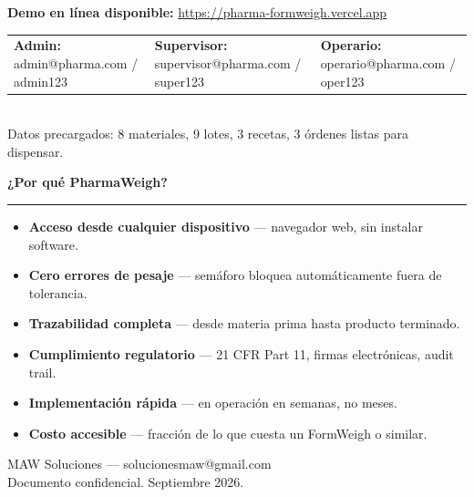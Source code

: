 \documentclass[11pt,letterpaper]{article}
\begin{document}
\vspace{14pt}

\begin{tcolorbox}[colback=pharmagreen!8, colframe=pharmagreen, rounded corners, boxrule=1.2pt, left=12pt, right=12pt, top=8pt, bottom=8pt]
\textbf{\color{pharmagreen}Demo en línea disponible:} \url{https://pharma-formweigh.vercel.app}\\[4pt]
\begin{tabular}{@{}lll@{}}
\textbf{Admin:} admin@pharma.com / admin123 &
\textbf{Supervisor:} supervisor@pharma.com / super123 &
\textbf{Operario:} operario@pharma.com / oper123
\end{tabular}\\[4pt]
Datos precargados: 8 materiales, 9 lotes, 3 recetas, 3 órdenes listas para dispensar.
\end{tcolorbox}

\vspace{10pt}

{\large\bfseries\color{tinta}¿Por qué PharmaWeigh?}\\[4pt]
{\color{pharmaazul}\rule{\linewidth}{0.8pt}}

\vspace{6pt}

\begin{itemize}
\item \textbf{Acceso desde cualquier dispositivo} --- navegador web, sin instalar software.
\item \textbf{Cero errores de pesaje} --- semáforo bloquea automáticamente fuera de tolerancia.
\item \textbf{Trazabilidad completa} --- desde materia prima hasta producto terminado.
\item \textbf{Cumplimiento regulatorio} --- 21 CFR Part 11, firmas electrónicas, audit trail.
\item \textbf{Implementación rápida} --- en operación en semanas, no meses.
\item \textbf{Costo accesible} --- fracción de lo que cuesta un FormWeigh o similar.
\end{itemize}

\vspace{14pt}

\begin{center}
{\footnotesize\color{gristexto}MAW Soluciones --- solucionesmaw@gmail.com}\\[2pt]
{\footnotesize\color{gristexto}Documento confidencial. Septiembre 2026.}
\end{center}
\end{document}
